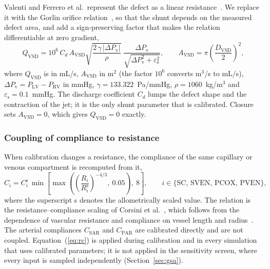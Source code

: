 Valenti and Ferrero et al.\ represent the defect as a linear resistance~\cite{Valenti2023,Ferrero2026Shunts}. We replace it with the Gorlin orifice relation~\cite{Gorlin1951}, so that the shunt depends on the measured defect area, and add a sign-preserving factor that makes the relation differentiable at zero gradient,
\begin{equation}
Q_{\mathrm{VSD}} = 10^{6}\, C_d\, A_{\mathrm{VSD}} \sqrt{\frac{2\,\gamma\,\lvert\Delta P_{\mathrm{v}}\rvert}{\rho}}\;
\frac{\Delta P_{\mathrm{v}}}{\sqrt{\Delta P_{\mathrm{v}}^{2} + \varepsilon_{\mathrm{s}}^{2}}},
\qquad A_{\mathrm{VSD}} = \pi\left(\frac{D_{\mathrm{VSD}}}{2}\right)^{2},
\label{eq:orifice}
\end{equation}
where $Q_{\mathrm{VSD}}$ is in mL/s, $A_{\mathrm{VSD}}$ in m$^2$ (the factor $10^{6}$ converts m$^3$/s to mL/s), $\Delta P_{\mathrm{v}} = P_{\mathrm{LV}} - P_{\mathrm{RV}}$ in mmHg, $\gamma = 133.322$~Pa/mmHg, $\rho = 1060$~kg/m$^3$ and $\varepsilon_{\mathrm{s}} = 0.1$~mmHg. The discharge coefficient $C_d$ lumps the defect shape and the contraction of the jet; it is the only shunt parameter that is calibrated. Closure sets $A_{\mathrm{VSD}} = 0$, which gives $Q_{\mathrm{VSD}} = 0$ exactly.

\subsubsection{Coupling of compliance to resistance}
\label{sec:rc}
When calibration changes a resistance, the compliance of the same capillary or venous compartment is recomputed from it,
\begin{equation}
C_i = C_{i}^{\mathrm{s}}\,\min\!\left[\max\!\left(\left(\frac{R_i}{R_i^{\mathrm{s}}}\right)^{-4/3},\ 0.05\right),\ 8\right],
\qquad i \in \{\mathrm{SC},\,\mathrm{SVEN},\,\mathrm{PCOX},\,\mathrm{PVEN}\},
\label{eq:rc}
\end{equation}
where the superscript s denotes the allometrically scaled value. The relation is the resistance--compliance scaling of Corsini et al.~\cite{Corsini2014}, which follows from the dependence of vascular resistance and compliance on vessel length and radius~\cite{Pennati2000}. The arterial compliances $C_{\mathrm{SAR}}$ and $C_{\mathrm{PAR}}$ are calibrated directly and are not coupled. Equation~(\ref{eq:rc}) is applied during calibration and in every simulation that uses calibrated parameters; it is not applied in the sensitivity screen, where every input is sampled independently (Section~\ref{sec:gsa}).

